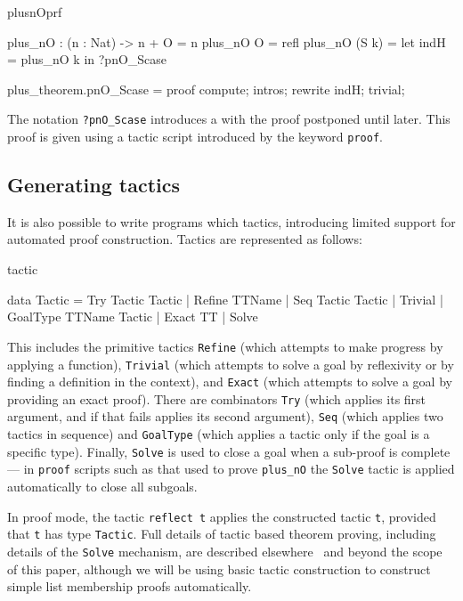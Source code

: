 \begin{SaveVerbatim}{plusnOprf}

plus_nO : (n : Nat) -> n + O = n
plus_nO O     = refl
plus_nO (S k) = let indH = plus_nO k in ?pnO_Scase

plus_theorem.pnO_Scase = proof {
  compute; intros;
  rewrite indH; trivial;
}

\end{SaveVerbatim}

\noindent
The notation \texttt{?pnO\_Scase} introduces a  with the
proof postponed until later. This proof is given using a tactic script introduced
by the keyword \texttt{proof}.

\subsection{Generating tactics}

It is also possible to write programs which  tactics, introducing
limited support for automated proof construction. Tactics are represented
as follows:

\begin{SaveVerbatim}{tactic}

data Tactic 
     = Try Tactic Tactic | Refine TTName
     | Seq Tactic Tactic | Trivial 
     | GoalType TTName Tactic | Exact TT | Solve

\end{SaveVerbatim}

\noindent
This includes the primitive tactics \texttt{Refine} (which attempts to make
progress by applying a function), \texttt{Trivial} (which attempts to solve
a goal by reflexivity or by finding a definition in the context), and
\texttt{Exact} (which attempts to solve a goal by providing an exact proof).
There are combinators \texttt{Try} (which applies its first argument, and if that
fails applies its second argument), \texttt{Seq} (which applies two
tactics in sequence) and \texttt{GoalType} (which applies a tactic only if the
goal is a specific type). Finally, \texttt{Solve} is used to close a goal
when a sub-proof is complete --- in \texttt{proof} scripts such as that used
to prove \texttt{plus\_nO} the \texttt{Solve} tactic is applied automatically
to close all subgoals.

In proof mode, the tactic \texttt{reflect t} applies the constructed tactic
\texttt{t}, provided that \texttt{t} has type \texttt{Tactic}. Full details
of tactic based theorem proving, including details of the \texttt{Solve}
mechanism, are described elsewhere~\cite{Brady2013} and
beyond the scope of this paper, although
we will be using basic tactic construction to construct simple list membership
proofs automatically.

